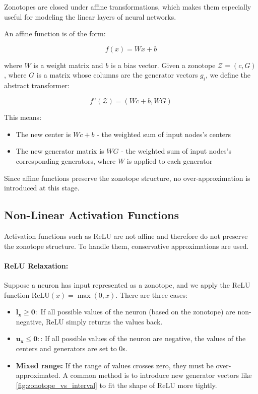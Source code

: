 \documentclass[oneside,11pt,dvipsnames]{book}
\numberwithin{equation}{section}
\theoremstyle{definition}
\theoremstyle{remark}
\begin{document}
Zonotopes are closed under affine transformations, which makes them especially useful for modeling the linear layers of neural networks.

An affine function is of the form:

\[
f(x) = W x + b
\]

where \(W\) is a weight matrix and \(b\) is a bias vector. Given a zonotope \(\mathcal{Z} = (c, G)\), where \(G\) is a matrix whose columns are the generator vectors \(g_i\), we define the abstract transformer:

\[
f^a(\mathcal{Z}) = (Wc + b, WG)
\]

This means:
\begin{itemize}
    \item The new center is \(Wc + b\) - the weighted sum of input nodes's centers
    \item The new generator matrix is \(WG\) - the weighted sum of input nodes's corresponding generators, where \(W\) is applied to each generator 
\end{itemize}

Since affine functions preserve the zonotope structure, no over-approximation is introduced at this stage.

\subsection{Non-Linear Activation Functions}

Activation functions such as ReLU are not affine and therefore do not preserve the zonotope structure. To handle them, conservative approximations are used.

\paragraph{ReLU Relaxation:} Suppose a neuron has input represented as a zonotope, and we apply the ReLU function \(\text{ReLU}(x) = \max(0, x)\). There are three cases:

\begin{itemize}
    \item \(\mathbf{l_x \geq 0:}\) If all possible values of the neuron (based on the zonotope) are non-negative, ReLU simply returns the values back.
    \item  \(\mathbf{u_x \leq 0:}\): If all possible values of the neuron are negative, the values of the centers and generators are set to 0s.
    \item \textbf{Mixed range:} If the range of values crosses zero, they must be over-approximated. A common method is to introduce new generator vectors like \ref{fig:zonotope_vs_interval} to fit the shape of ReLU more tightly.
\end{itemize}
\end{document}
